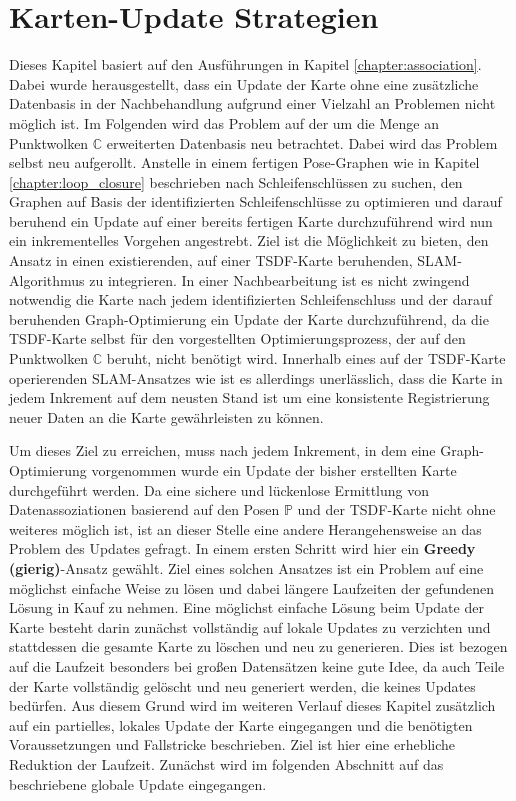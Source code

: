 \chapter{Karten-Update Strategien}
\label{chapter:map_update}

Dieses Kapitel basiert auf den Ausführungen in Kapitel \ref{chapter:association}. Dabei wurde herausgestellt, dass ein Update der Karte ohne eine zusätzliche Datenbasis in der Nachbehandlung aufgrund einer Vielzahl an Problemen nicht möglich ist. Im Folgenden wird das Problem auf der um die Menge an Punktwolken $\mathbb{C}$ erweiterten Datenbasis neu betrachtet. Dabei wird das Problem selbst neu aufgerollt. Anstelle in einem fertigen Pose-Graphen wie in Kapitel \ref{chapter:loop_closure} beschrieben nach Schleifenschlüssen zu suchen, den Graphen auf Basis der identifizierten Schleifenschlüsse zu optimieren und darauf beruhend ein Update auf einer bereits fertigen Karte durchzuführend wird nun ein inkrementelles Vorgehen angestrebt. Ziel ist die Möglichkeit zu bieten, den Ansatz in einen existierenden, auf einer TSDF-Karte beruhenden, SLAM-Algorithmus zu integrieren. In einer Nachbearbeitung ist es nicht zwingend notwendig die Karte nach jedem identifizierten Schleifenschluss und der darauf beruhenden Graph-Optimierung ein Update der Karte durchzuführend, da die TSDF-Karte selbst für den vorgestellten Optimierungsprozess, der auf den Punktwolken $\mathbb{C}$ beruht, nicht benötigt wird. Innerhalb eines auf der TSDF-Karte operierenden SLAM-Ansatzes wie \cite{HATSDF} ist es allerdings unerlässlich, dass die Karte in jedem Inkrement auf dem neusten Stand ist um eine konsistente Registrierung neuer Daten an die Karte gewährleisten zu können.

Um dieses Ziel zu erreichen, muss nach jedem Inkrement, in dem eine Graph-Optimierung vorgenommen wurde ein Update der bisher erstellten Karte durchgeführt werden. Da eine sichere und lückenlose Ermittlung von Datenassoziationen basierend auf den Posen $\mathbb{P}$ und der TSDF-Karte nicht ohne weiteres möglich ist, ist an dieser Stelle eine andere Herangehensweise an das Problem des Updates gefragt. In einem ersten Schritt wird hier ein \textbf{Greedy (gierig)}-Ansatz gewählt. Ziel eines solchen Ansatzes ist ein Problem auf eine möglichst einfache Weise zu lösen und dabei längere Laufzeiten der gefundenen Lösung in Kauf zu nehmen. Eine möglichst einfache Lösung beim Update der Karte besteht darin zunächst vollständig auf lokale Updates zu verzichten und stattdessen die gesamte Karte zu löschen und neu zu generieren. Dies ist bezogen auf die Laufzeit besonders bei großen Datensätzen keine gute Idee, da auch Teile der Karte vollständig gelöscht und neu generiert werden, die keines Updates bedürfen. Aus diesem Grund wird im weiteren Verlauf dieses Kapitel zusätzlich auf ein partielles, lokales Update der Karte eingegangen und die benötigten Voraussetzungen und Fallstricke beschrieben. Ziel ist hier eine erhebliche Reduktion der Laufzeit. Zunächst wird im folgenden Abschnitt auf das beschriebene globale Update eingegangen.

